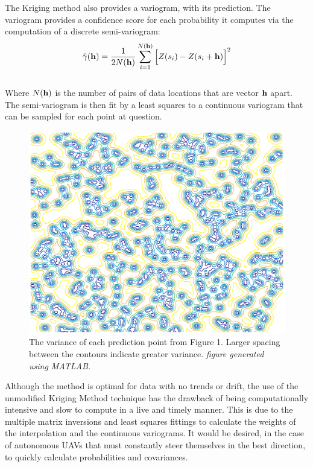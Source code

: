 \documentclass[preprint,12pt]{elsarticle}
\begin{document}
The Kriging method also provides a variogram, with its prediction. The variogram provides a confidence score for each probability it computes via the computation of a discrete semi-variogram:\\
\begin{equation}
\hat{\gamma}({\bf{h}})=\dfrac{1}{2N({\bf{h}})}\sum_{i=1}^{N({\bf{h}})}\Big[Z(s_{i})-Z(s_{i}+{\bf{h}})\Big]^{2}
\end{equation}\\
Where $N({\bf{h}})$ is the number of pairs of data locations that are vector ${\bf{h}}$ apart.\\
The semi-variogram is then fit by a least squares to a continuous variogram that can be sampled for each point at question.
\begin{center}
	\begin{figure}[h]
		\centering
		\includegraphics[scale=.5]{kriging_variance.eps}
		\caption{The variance of each prediction point from Figure 1. Larger spacing between the contours indicate greater variance. \textit{figure generated using MATLAB.}}
	\end{figure}
\end{center}
Although the method is optimal for data with no trends or drift, the use of the unmodified Kriging Method technique has the drawback of being computationally intensive and slow to compute in a live and timely manner. This is due to the multiple matrix inversions and least squares fittings to calculate the weights of the interpolation and the continuous variograms. It would be desired, in the case of autonomous UAVs that must constantly steer themselves in the best direction, to quickly calculate probabilities and covariances. \\
\end{document}

